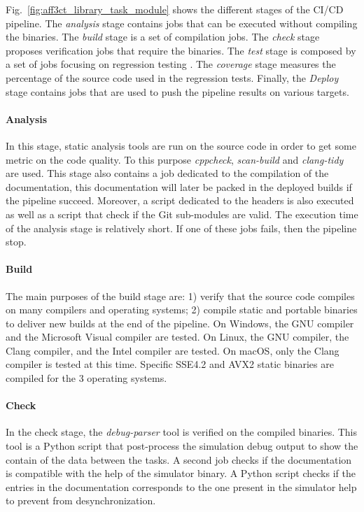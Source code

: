 Fig.~\ref{fig:aff3ct_library_task_module} shows the different stages of the
\AFFECT CI/CD pipeline. The \emph{analysis} stage contains jobs that can be
executed without compiling the \AFFECT binaries. The \emph{build} stage is a set
of compilation jobs. The \emph{check} stage proposes verification jobs that
require the \AFFECT binaries. The \emph{test} stage is composed by a set of jobs
focusing on regression testing . The \emph{coverage} stage measures the
percentage of the \AFFECT source code used in the regression tests. Finally, the
\emph{Deploy} stage contains jobs that are used to push the pipeline results on
various targets.

\paragraph{Analysis}

In this stage, static analysis tools are run on the \AFFECT source code
in order to get some metric on the code quality. To this purpose
\textit{cppcheck}, \textit{scan-build} and \textit{clang-tidy} are used. This
stage also contains a job dedicated to the compilation of the documentation,
this documentation will later be packed in the deployed builds if the pipeline
succeed. Moreover, a script dedicated to the \AFFECT headers is also executed as
well as a script that check if the Git sub-modules are valid. The execution time
of the analysis stage is relatively short. If one of these jobs fails, then the
pipeline stop.

\paragraph{Build}

The main purposes of the build stage are: 1) verify that the \AFFECT source code
compiles on many compilers and operating systems; 2) compile static and portable
binaries to deliver new builds at the end of the pipeline. On Windows, the GNU
compiler and the Microsoft Visual compiler are tested. On Linux, the GNU
compiler, the Clang compiler, and the Intel compiler are  tested. On macOS, only
the Clang compiler is tested at this time. Specific SSE4.2 and AVX2 static
binaries are compiled for the 3 operating systems.

\paragraph{Check}

In the check stage, the \emph{debug-parser} tool is verified on the compiled
\AFFECT binaries. This tool is a Python script that post-process the \AFFECT
simulation debug output to show the contain of the data between the tasks. A
second job checks if the documentation is compatible with the help of the
\AFFECT simulator binary. A Python script checks if the entries in the
documentation corresponds to the one present in the simulator help to prevent
from desynchronization.

